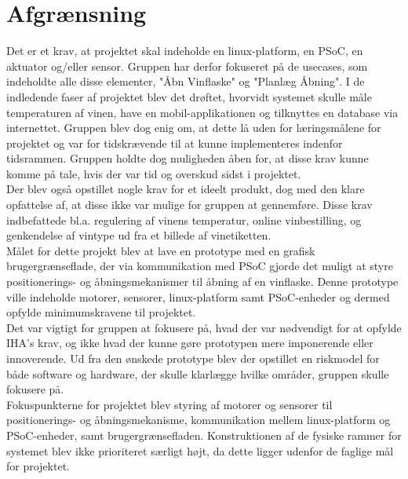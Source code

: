 \chapter{Afgrænsning}
Det er et krav, at projektet skal indeholde en linux-platform, en PSoC, en aktuator og/eller sensor. Gruppen har derfor fokuseret på de usecases, som 
indeholdte alle disse elementer, "Åbn Vinflaske" og "Planlæg Åbning". I de indledende faser af projektet blev det drøftet, hvorvidt systemet skulle måle temperaturen
af vinen, have en mobil-applikationen og tilknyttes en database via internettet. Gruppen blev dog enig om, at dette lå uden for læringsmålene for projektet 
og var for tidskrævende til at kunne implementeres indenfor tidsrammen. Gruppen holdte dog muligheden åben for, at disse krav kunne komme på tale, hvis der var
tid og overskud sidst i projektet. \\

Der blev også opstillet nogle krav for et ideelt produkt, dog med den klare opfattelse af, at disse ikke var mulige for gruppen at gennemføre. Disse krav 
indbefattede bl.a. regulering af vinens temperatur, online vinbestilling, og genkendelse af vintype ud fra et billede af vinetiketten. \\

Målet for dette projekt blev at lave en prototype med en grafisk brugergrænseflade, der via kommunikation med PSoC gjorde det muligt at styre positionerings- 
og åbningsmekanismer til åbning af en vinflaske. Denne prototype ville indeholde motorer, sensorer, linux-platform samt PSoC-enheder og dermed opfylde minimumskravene til projektet. \\

Det var vigtigt for gruppen at fokusere på, hvad der var nødvendigt for at opfylde IHA's krav, og ikke hvad der kunne gøre prototypen mere 
imponerende eller innoverende. Ud fra den ønskede prototype blev der opstillet en riskmodel for både software og hardware, der skulle klarlægge hvilke områder, gruppen skulle fokusere på. \\ 

Fokuspunkterne for projektet blev styring af motorer og sensorer til positionerings- og åbningsmekanisme, kommunikation mellem 
linux-platform og PSoC-enheder, samt brugergrænsefladen. Konstruktionen af de fysiske rammer for systemet blev ikke prioriteret særligt højt, da dette ligger 
udenfor de faglige mål for projektet.       